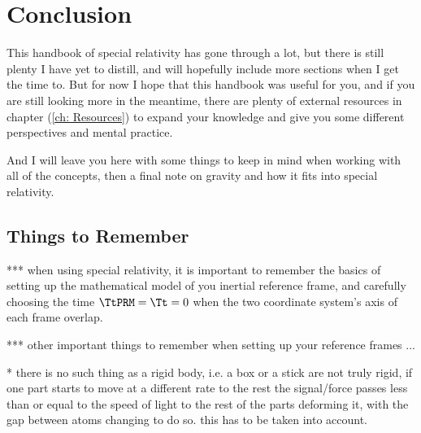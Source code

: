 \chapter{Conclusion}\label{ch: Conclusion}

This handbook of special relativity has gone through a lot, but there is still plenty I have yet to distill, and will hopefully include more sections when I get the time to.
But for now I hope that this handbook was useful for you, and if you are still looking more in the meantime, there are plenty of external resources in chapter (\ref{ch: Resources}) to expand your knowledge and give you some different perspectives and mental practice.

And I will leave you here with some things to keep in mind when working with all of the concepts, then a final note on gravity and how it fits into special relativity.



\section{Things to Remember}\label{sect: Things to Remember}

*** when using special relativity, it is important to remember the basics of setting up the mathematical model of you inertial reference frame, and carefully choosing the time $\TtPRM=\Tt=0$ when the two coordinate system's axis of each frame overlap.

*** other important things to remember when setting up your reference frames ...

* there is no such thing as a rigid body, i.e. a box or a stick are not truly rigid, if one part starts to move at a different rate to the rest the signal/force passes less than or equal to the speed of light to the rest of the parts deforming it, with the gap between atoms changing to do so. this has to be taken into account.

